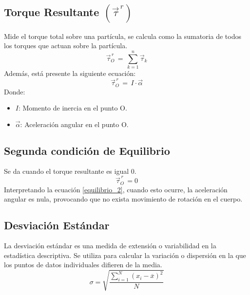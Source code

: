 \documentclass[../main]{subfiles}
\begin{document}
\subsection{Torque Resultante $(\vec{\tau}^{\,r})$}
Mide el torque total sobre una partícula, se calcula como la 
sumatoria de todos los torques que actuan sobre la partícula.
\begin{equation} \label{torque_resultante1}
    \vec{\tau}_O^{\,r} \, = \, \sum^n_{k=1} \vec{\tau}_k
\end{equation}
Además, está presente la siguiente ecuación:
\begin{equation} \label{torque_resultante2}
    \vec{\tau}_O^{\,r} \, = \, I \cdot  \vec{\alpha}
\end{equation}
Donde:
\begin{itemize}
    \item $I$: Momento de inercia en el punto O.
    \item $\vec{\alpha}$: Aceleración angular en el punto O.
\end{itemize}

\subsection{Segunda condición de Equilibrio}
Se da cuando el torque resultante es igual 0.
\begin{equation} \label{equilibrio_2}
    \vec{\tau}_O^{\,r} \, = 0
\end{equation}
Interpretando la ecuación \ref{equilibrio_2}, cuando esto ocurre, la aceleración 
angular es nula, provocando que no exista movimiento de rotación en el cuerpo.


\subsection{Desviación Estándar}
La desviación estándar es una medida de extensión o 
variabilidad en la estadística descriptiva. 
Se utiliza para calcular la variación o dispersión
en la que los puntos de datos individuales difieren 
de la media. 
\begin{equation} \label{desviacion_eq}
    \sigma = \sqrt{\frac{\sum^N_{i=1} (x_i - \overline{x})^2}{N}}
\end{equation}
\end{document}
